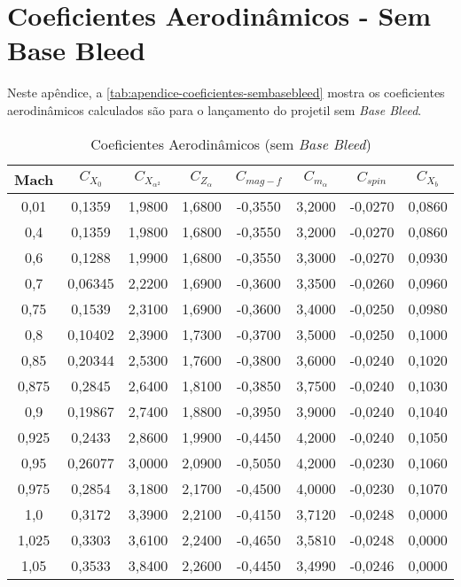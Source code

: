 \chapter{Coeficientes Aerodinâmicos - Sem Base Bleed}\label{apend:apendice-sembb}

Neste apêndice, a \autoref{tab:apendice-coeficientes-sembasebleed} mostra os coeficientes aerodinâmicos calculados são para o lançamento do projetil sem \textit{Base Bleed}.

\begin{table}[ht]
\centering
\caption[Coeficientes Aerodinâmicos (sem \textit{Base Bleed})]{Coeficientes Aerodinâmicos (sem \textit{Base Bleed})}
\vspace{0.5cm}
\begin{tabular}{c|c|c|c|c|c|c|c}
Mach & \(C_{X_0}\) & \(C_{X_{\alpha^2}}\) & \(C_{Z_\alpha}\) & \(C_{mag-f}\) & \(C_{m_{\alpha}}\) & \(C_{spin}\) & \(C_{X_b}\) \\\hline
0,01  & 0,1359  & 1,9800 & 1,6800 & -0,3550 & 3,2000 & -0,0270 & 0,0860 \\
0,4   & 0,1359  & 1,9800 & 1,6800 & -0,3550 & 3,2000 & -0,0270 & 0,0860 \\
0,6   & 0,1288  & 1,9900 & 1,6800 & -0,3550 & 3,3000 & -0,0270 & 0,0930 \\
0,7   & 0,06345 & 2,2200 & 1,6900 & -0,3600 & 3,3500 & -0,0260 & 0,0960 \\
0,75  & 0,1539  & 2,3100 & 1,6900 & -0,3600 & 3,4000 & -0,0250 & 0,0980 \\
0,8   & 0,10402 & 2,3900 & 1,7300 & -0,3700 & 3,5000 & -0,0250 & 0,1000 \\
0,85  & 0,20344 & 2,5300 & 1,7600 & -0,3800 & 3,6000 & -0,0240 & 0,1020 \\
0,875 & 0,2845  & 2,6400 & 1,8100 & -0,3850 & 3,7500 & -0,0240 & 0,1030 \\
0,9   & 0,19867 & 2,7400 & 1,8800 & -0,3950 & 3,9000 & -0,0240 & 0,1040 \\
0,925 & 0,2433  & 2,8600 & 1,9900 & -0,4450 & 4,2000 & -0,0240 & 0,1050 \\
0,95  & 0,26077 & 3,0000 & 2,0900 & -0,5050 & 4,2000 & -0,0230 & 0,1060 \\
0,975 & 0,2854  & 3,1800 & 2,1700 & -0,4500 & 4,0000 & -0,0230 & 0,1070 \\
1,0   & 0,3172  & 3,3900 & 2,2100 & -0,4150 & 3,7120 & -0,0248 & 0,0000 \\
1,025 & 0,3303  & 3,6100 & 2,2400 & -0,4650 & 3,5810 & -0,0248 & 0,0000 \\
1,05  & 0,3533  & 3,8400 & 2,2600 & -0,4450 & 3,4990 & -0,0246 & 0,0000 \\

\end{tabular}
\end{table}
